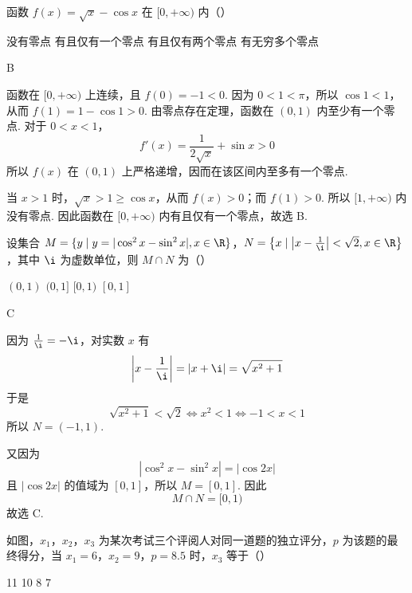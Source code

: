 \begin{problem}
函数 \( f(x) = \sqrt{x} - \cos x \) 在 \([0, +\infty)\) 内（\quad）

\choices
    {没有零点}
    {有且仅有一个零点}
    {有且仅有两个零点}
    {有无穷多个零点}
\end{problem}

\begin{answer}
B
\end{answer}

\begin{solution}
函数在 \([0,+\infty)\) 上连续，且 \(f(0)=-1<0\). 因为 \(0<1<\pi\)，所以 \(\cos 1<1\)，从而 \(f(1)=1-\cos 1>0\).
由零点存在定理，函数在 \((0,1)\) 内至少有一个零点. 对于 \(0<x<1\)，
\[
f'(x)=\frac{1}{2\sqrt{x}}+\sin x>0
\]
所以 \(f(x)\) 在 \((0,1)\) 上严格递增，因而在该区间内至多有一个零点.

当 \(x>1\) 时，\(\sqrt{x}>1\geqslant\cos x\)，从而 \(f(x)>0\)；而 \(f(1)>0\). 所以 \([1,+\infty)\) 内没有零点. 因此函数在 \([0,+\infty)\) 内有且仅有一个零点，故选 B.
\end{solution}

\begin{problem}
设集合 \(M = \{y \mid y = |\cos^2 x - \sin^2 x|, x \in \R\}\)，\(N = \left\{x \mid \left|x - \frac{1}{\i}\right| < \sqrt{2}, x \in \R\right\}\)，其中 \(\i\) 为虚数单位，则 \(M \cap N\) 为（\quad）

\choices
    {\((0,1)\)}
    {\((0,1]\)}
    {\([0,1)\)}
    {\([0,1]\)}
\end{problem}

\begin{answer}
C
\end{answer}

\begin{solution}
因为 \(\frac{1}{\i}=-\i\)，对实数 \(x\) 有
\[
\left|x-\frac{1}{\i}\right|=|x+\i|=\sqrt{x^2+1}
\]
于是
\[
\sqrt{x^2+1}<\sqrt{2}\Longleftrightarrow x^2<1\Longleftrightarrow -1<x<1
\]
所以 \(N=(-1,1)\).

又因为
\[
|\cos^2x-\sin^2x|=|\cos 2x|
\]
且 \(|\cos 2x|\) 的值域为 \([0,1]\)，所以 \(M=[0,1]\). 因此
\[
M\cap N=[0,1)
\]
故选 C.
\end{solution}

\begin{problem}
如图，\(x_{1}\)，\(x_{2}\)，\(x_{3}\) 为某次考试三个评阅人对同一道题的独立评分，\(p\) 为该题的最终得分，当 \(x_{1} = 6\)，\(x_{2} = 9\)，\(p = 8.5\) 时，\(x_{3}\) 等于（\quad）


\choices
    {11}
    {10}
    {8}
    {7}
\end{problem}

